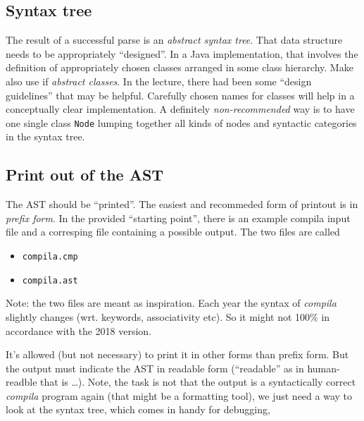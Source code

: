 \documentclass[11pt,freeform]{handout}[2014/08/13]
\begin{document}
\subsection{Syntax tree}
\label{sec:syntax-tree}

The result of a successful parse is an \emph{abstract syntax tree}. That
data structure needs to be appropriately ``designed''. In a Java
implementation, that involves the definition of appropriately chosen
classes arranged in some class hierarchy. Make also use if \emph{abstract
  classes}. In the lecture, there had been some ``design guidelines'' that
may be helpful. Carefully chosen names for classes will help in a
conceptually clear implementation. A definitely \emph{non-recommended} way
is to have one single class \texttt{Node} lumping together all kinds of
nodes and syntactic categories in the syntax tree.







\subsection{Print out of the AST}
\label{sec:print-out-ast}


The AST should be ``printed''. The easiest and recommeded form of printout
is in \emph{prefix form}. In the provided ``starting point'', there is an
example compila input file and a corresping file containing a possible
output. The two files are called

\begin{itemize}
\item \texttt{compila.cmp}
\item \texttt{compila.ast}
\end{itemize}


Note: the two files are meant as inspiration. Each year the syntax of
\textsl{compila} slightly changes (wrt. keywords, associativity etc). So it
might not 100\% in accordance with the 2018 version.

It's allowed (but not necessary) to print it in other forms than prefix
form. But the output must indicate the AST in readable form (``readable''
as in human-readble that is \ldots). Note, the task is not that the output
is a syntactically correct \textsl{compila} program again (that might be a
formatting tool), we just need a way to look at the syntax tree, which
comes in handy for debugging,


%
% 
\end{document}
